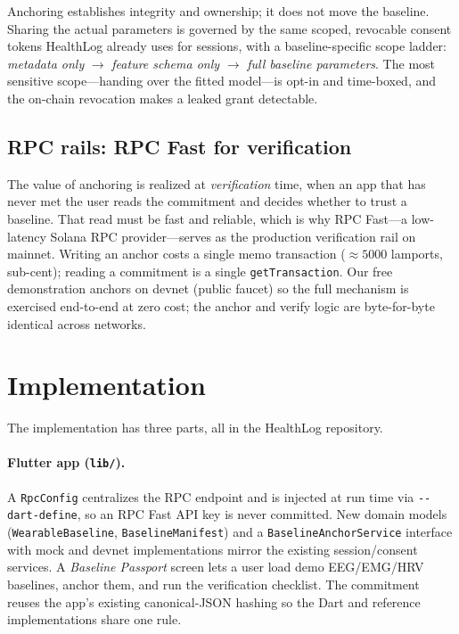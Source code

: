 \documentclass[10pt,twocolumn]{article}
\newcommand{\code}[1]{\texttt{\small #1}}
\begin{document}
Anchoring establishes integrity and ownership; it does not move the baseline.
Sharing the actual parameters is governed by the same scoped, revocable consent
tokens HealthLog already uses for sessions, with a baseline-specific scope
ladder: \emph{metadata only} $\to$ \emph{feature schema only} $\to$ \emph{full
baseline parameters}. The most sensitive scope---handing over the fitted
model---is opt-in and time-boxed, and the on-chain revocation makes a leaked
grant detectable.

\subsection{RPC rails: RPC Fast for verification}

The value of anchoring is realized at \emph{verification} time, when an app that
has never met the user reads the commitment and decides whether to trust a
baseline. That read must be fast and reliable, which is why RPC Fast---a
low-latency Solana RPC provider---serves as the production verification rail on
mainnet. Writing an anchor costs a single memo transaction
($\approx\!5000$ lamports, sub-cent); reading a commitment is a single
\code{getTransaction}. Our free demonstration anchors on devnet (public faucet)
so the full mechanism is exercised end-to-end at zero cost; the anchor and
verify logic are byte-for-byte identical across networks.

\section{Implementation}

The implementation has three parts, all in the HealthLog repository.

\paragraph{Flutter app (\code{lib/}).} A \code{RpcConfig} centralizes the RPC
endpoint and is injected at run time via \code{-{}-dart-define}, so an RPC Fast
API key is never committed. New domain models (\code{WearableBaseline},
\code{BaselineManifest}) and a \code{BaselineAnchorService} interface with mock
and devnet implementations mirror the existing session/consent services. A
\emph{Baseline Passport} screen lets a user load demo EEG/EMG/HRV baselines,
anchor them, and run the verification checklist. The commitment reuses the app's
existing canonical-JSON hashing so the Dart and reference implementations share
one rule.
\end{document}
